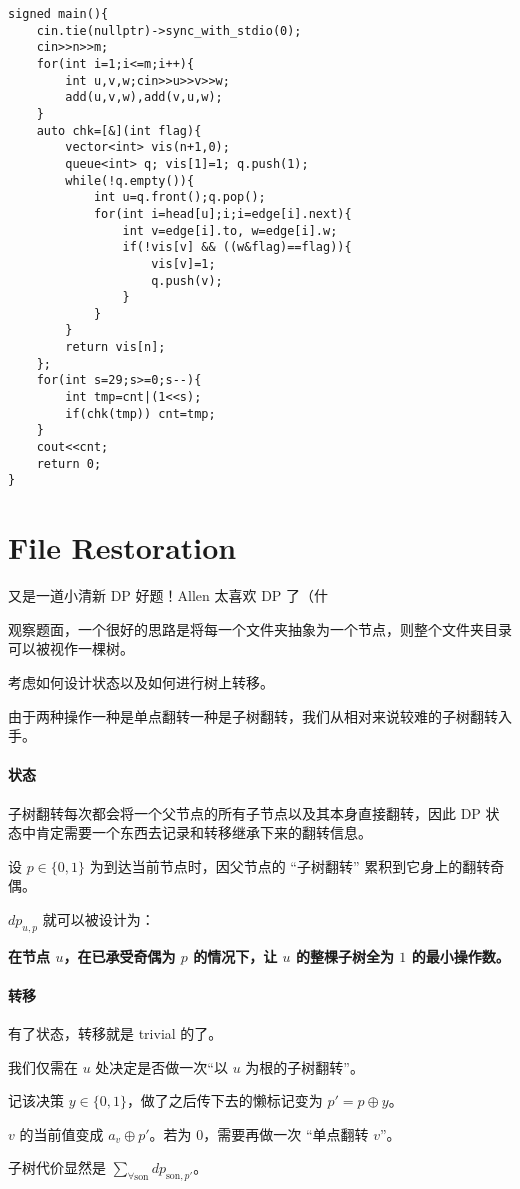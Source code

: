 \documentclass[14pt,a4paper]{article}
\begin{document}
\begin{verbatim}
signed main(){
	cin.tie(nullptr)->sync_with_stdio(0);
	cin>>n>>m;
	for(int i=1;i<=m;i++){
		int u,v,w;cin>>u>>v>>w;
		add(u,v,w),add(v,u,w);
	}
	auto chk=[&](int flag){
		vector<int> vis(n+1,0);
		queue<int> q; vis[1]=1; q.push(1);
		while(!q.empty()){
			int u=q.front();q.pop();
			for(int i=head[u];i;i=edge[i].next){
				int v=edge[i].to, w=edge[i].w;
				if(!vis[v] && ((w&flag)==flag)){
					vis[v]=1;
					q.push(v);
				}
			}
		}
		return vis[n];
	};
	for(int s=29;s>=0;s--){
		int tmp=cnt|(1<<s);
		if(chk(tmp)) cnt=tmp;
	}
	cout<<cnt;
	return 0;
}
\end{verbatim}

\section{File Restoration}
又是一道小清新 DP 好题！Allen 太喜欢 DP 了（什

观察题面，一个很好的思路是将每一个文件夹抽象为一个节点，则整个文件夹目录可以被视作一棵树。

考虑如何设计状态以及如何进行树上转移。

由于两种操作一种是单点翻转一种是子树翻转，我们从相对来说较难的子树翻转入手。

\paragraph{状态}
子树翻转每次都会将一个父节点的所有子节点以及其本身直接翻转，因此 DP 状态中肯定需要一个东西去记录和转移继承下来的翻转信息。

设 $p\in\{0,1\}$ 为到达当前节点时，因父节点的 “子树翻转” 累积到它身上的翻转奇偶。

$dp_{u,p}$ 就可以被设计为：

\textbf{在节点 $u$，在已承受奇偶为 $p$ 的情况下，让 $u$ 的整棵子树全为 $1$ 的最小操作数。}

\paragraph{转移}
有了状态，转移就是 trivial 的了。

我们仅需在 $u$ 处决定是否做一次“以 $u$ 为根的子树翻转”。

记该决策 $y\in\{0,1\}$，做了之后传下去的懒标记变为 $p' = p\oplus y$。

$v$ 的当前值变成 $a_v\oplus p'$。若为 $0$，需要再做一次 “单点翻转 $v$”。

子树代价显然是 $\sum_{\forall \text{son}} dp_{\text{son},p'}$。
\end{document}
